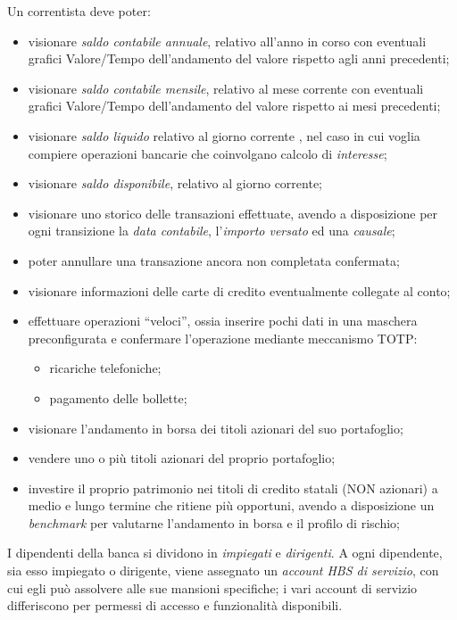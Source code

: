 Un correntista deve poter:
\begin{itemize} 
	\item visionare \emph{saldo contabile annuale}, relativo all'anno in corso con eventuali grafici Valore/Tempo dell'andamento del valore rispetto agli anni precedenti;
	\item visionare \emph{saldo contabile mensile}, relativo al mese corrente con eventuali grafici Valore/Tempo dell'andamento del valore rispetto ai mesi precedenti;
	\item visionare \emph{saldo liquido} relativo al giorno corrente , nel caso in cui voglia compiere operazioni bancarie che coinvolgano calcolo di \emph{interesse};
	\item visionare \emph{saldo disponibile}, relativo al giorno corrente;
	\item visionare uno storico delle transazioni effettuate, avendo a disposizione per ogni transizione la \emph{data contabile}, l'\emph{importo versato} ed una \emph{causale};
	\item poter annullare una transazione ancora non completata confermata;
	\item visionare informazioni delle carte di credito eventualmente collegate al conto;
	\item effettuare operazioni ``veloci'', ossia inserire pochi dati in una maschera preconfigurata e confermare l'operazione mediante meccanismo TOTP:
	\begin{itemize}
			\item ricariche telefoniche;
			\item pagamento delle bollette;
	\end{itemize}
	\item visionare l'andamento in borsa dei titoli azionari del suo portafoglio;
	\item vendere uno o più titoli azionari del proprio portafoglio;
	\item investire il proprio patrimonio nei titoli di credito statali (NON azionari) a medio e lungo termine che ritiene più opportuni, avendo a disposizione un \emph{benchmark} per valutarne l'andamento in borsa e il profilo di rischio;
\end{itemize}	

I dipendenti della banca si dividono in \emph{impiegati} e \emph{dirigenti}. A ogni dipendente, sia esso impiegato o dirigente, viene assegnato un \emph{account HBS di servizio}, con cui egli può assolvere alle sue mansioni specifiche; i vari account di servizio differiscono per permessi di accesso e funzionalità disponibili.

